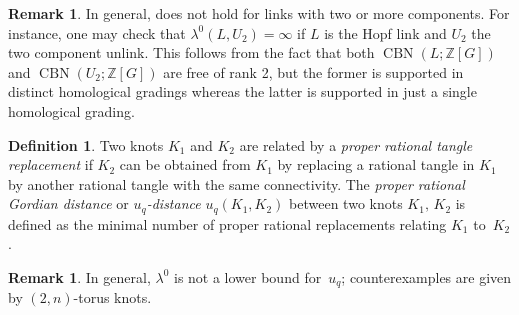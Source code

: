 \documentclass[11pt,a4paper,twoside]{amsart}
\let\cref\Cref
\theoremstyle{definition}
\newtheorem{definition}[theorem]{Definition}
\newtheorem{remark}[theorem]{Remark}
\def\lambda{λ}%
\newcommand{\lambdau}{\lambda^0}
\newcommand{\BNr}{{\operatorname{CBN}}}%
\newcommand{\Z}{\mathbb{Z}}
\begin{document}
\thmlambdagordian*


\begin{remark}
	In general, \cref{thm:lambda-gordian} does not hold for links with two or more components. 
	For instance, one may check that $\lambdau(L,U_2)=\infty$ if $L$ is the Hopf link and $U_2$ the two component unlink. 
	This follows from the fact that both \(\BNr(L;\Z[G])\) and \(\BNr(U_2;\Z[G])\) are free of rank 2, but the former is supported in distinct homological gradings whereas the latter is supported in just a single homological grading. 
\end{remark}

\begin{definition} \label{def:proper_rational_gordian}
    Two knots $K_1$ and $K_2$ are related by a  \emph{proper rational tangle replacement} if $K_2$ can be obtained from $K_1$ by replacing a rational tangle in $K_1$ by another rational tangle with the same connectivity. 
    The \emph{proper rational Gordian distance} or \emph{$u_q$-distance} $u_q(K_1,K_2)$ between two knots $K_1,\, K_2$ is defined as the minimal number of proper rational replacements relating $K_1$ to~$K_2$.
%
\end{definition}

\thmlambdarational*

\begin{remark}
    In general, $\lambdau$ is not a lower bound for~$u_q$;  counterexamples are given by $(2,n)$-torus knots. 
\end{remark}
\end{document}
